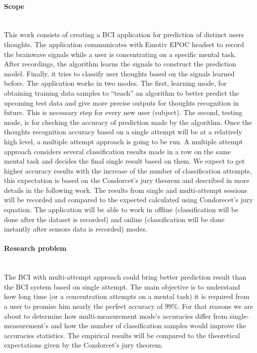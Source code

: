 \documentclass[12pt]{article}
\theoremstyle{definition}
\begin{document}
\paragraph{Scope}~\\

This work consists of creating a BCI application for prediction of distinct users thoughts. The application communicates with Emotiv EPOC headset \cite{emotiv} to record the brainwave signals while a user is concentrating on a specific mental task. After recordings, the algorithm learns the signals to construct the prediction model. Finally, it tries to classify user thoughts based on the signals learned before. The application works in two modes. The first, learning mode, for obtaining training data samples to ``teach'' an algorithm to better predict the upcoming test data and give more precise outputs for thoughts recognition in future. This is necessary step for every new user (subject). The second, testing mode, is for checking the accuracy of prediction made by the algorithm. Once the thoughts recognition accuracy based on a single attempt will be at a relatively high level, a multiple attempt approach is going to be run. A multiple attempt approach considers several classification results made in a row on the same mental task and decides the final single result based on them. We expect to get higher accuracy results with the increase of the number of classification attempts, this expectation is based on the Condorcet's jury theorem and described in more details in the following work. The results from single and multi-attempt sessions will be recorded and compared to the expected calculated using Condorecet's jury equation. The application will be able to work in offline (classification will be done after the dataset is recorded) and online (classification will be done instantly after sensors data is recorded) modes.
\paragraph{Research problem}~\\

The BCI with multi-attempt approach could bring better prediction result than the BCI system based on single attempt. The main objective is to understand how long time (or a concentration attempts on a mental task) it is required from a user to promise him nearly the perfect accuracy of 99\%. For that reasons we are about to determine how multi-measurement mode's accuracies differ from single-measurement's and how the number of classification samples would improve the accuracies statistics. The empirical results will be compared to the theoretical expectations given by the Condorcet's jury theorem.
\end{document}
